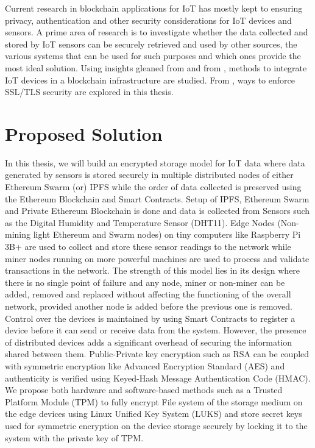 \documentclass[11pt,openright]{report}
\begin{document}
Current research in blockchain applications for IoT has mostly kept to ensuring privacy, authentication and other security considerations \cite{8012302} for IoT devices and sensors. A prime area of research is to investigate whether the data collected and stored by IoT sensors can be securely retrieved and used by other sources, the various systems that can be used for such purposes and which ones provide the most ideal solution. Using insights gleaned from \cite{8094378} and from \cite{8634961}, methods to integrate IoT devices in a blockchain infrastructure are studied. From  \cite{8644498}, ways to enforce SSL/TLS security are explored in this thesis.

\section{Proposed Solution}\label{section:proposed_solution}
In this thesis, we will build an encrypted storage model for IoT data where data generated by sensors is stored securely in multiple distributed nodes of either Ethereum Swarm (or) IPFS while the order of data collected is preserved using the Ethereum Blockchain and Smart Contracts. Setup of IPFS, Ethereum Swarm and Private Ethereum Blockchain is done and data is collected from Sensors such as the Digital Humidity and Temperature Sensor (DHT11). Edge Nodes (Non-mining light Ethereum and Swarm nodes) on tiny computers like Raspberry Pi 3B+ are used to collect and store these sensor readings to the network while miner nodes running on more powerful machines are used to process and validate transactions in the network. The strength of this model lies in its design where there is no single point of failure and any node, miner or non-miner can be added, removed and replaced without affecting the functioning of the overall network, provided another node is added before the previous one is removed. Control over the devices is maintained by using Smart Contracts to register a device \cite{zhang2018smart} before it can send or receive data from the system. However, the presence of distributed devices adds a significant overhead of securing the information shared between them. Public-Private key encryption such as RSA can be coupled with symmetric encryption like Advanced Encryption Standard (AES) and authenticity is verified using Keyed-Hash Message Authentication Code (HMAC). We propose both hardware and software-based methods such as a Trusted Platform Module (TPM) to fully encrypt File system of the storage medium on the edge devices using Linux Unified Key System (LUKS) and store secret keys used for symmetric encryption on the device storage securely by locking it to the system with the private key of TPM.
\end{document}
